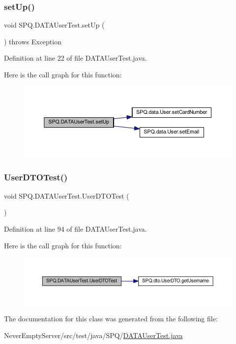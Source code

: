 \subsubsection{\texorpdfstring{set\+Up()}{setUp()}}
{\footnotesize\ttfamily void S\+P\+Q.\+D\+A\+T\+A\+User\+Test.\+set\+Up (\begin{DoxyParamCaption}{ }\end{DoxyParamCaption}) throws Exception}



Definition at line 22 of file D\+A\+T\+A\+User\+Test.\+java.

Here is the call graph for this function\+:\nopagebreak
\begin{figure}[H]
\begin{center}
\leavevmode
\includegraphics[width=350pt]{class_s_p_q_1_1_d_a_t_a_user_test_a703753b88018d83f5a2d3b76d335889a_cgraph}
\end{center}
\end{figure}
\mbox{\label{class_s_p_q_1_1_d_a_t_a_user_test_a4feb113d2b2971c37851e1b6bddca741}} 
\subsubsection{\texorpdfstring{User\+D\+T\+O\+Test()}{UserDTOTest()}}
{\footnotesize\ttfamily void S\+P\+Q.\+D\+A\+T\+A\+User\+Test.\+User\+D\+T\+O\+Test (\begin{DoxyParamCaption}{ }\end{DoxyParamCaption})}



Definition at line 94 of file D\+A\+T\+A\+User\+Test.\+java.

Here is the call graph for this function\+:\nopagebreak
\begin{figure}[H]
\begin{center}
\leavevmode
\includegraphics[width=350pt]{class_s_p_q_1_1_d_a_t_a_user_test_a4feb113d2b2971c37851e1b6bddca741_cgraph}
\end{center}
\end{figure}


The documentation for this class was generated from the following file\+:\begin{DoxyCompactItemize}
\item 
Never\+Empty\+Server/src/test/java/\+S\+P\+Q/\mbox{\hyperlink{_d_a_t_a_user_test_8java}{D\+A\+T\+A\+User\+Test.\+java}}\end{DoxyCompactItemize}
